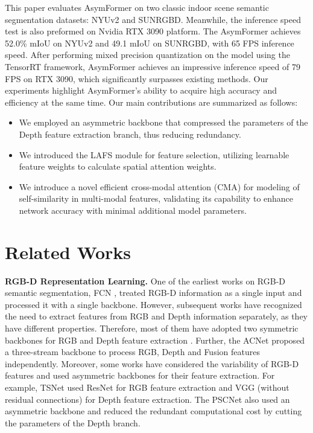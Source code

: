 \documentclass[letterpaper, 10 pt, conference]{ieeeconf}
\begin{document}
This paper evaluates AsymFormer on two classic indoor scene semantic segmentation datasets: NYUv2 and SUNRGBD. Meanwhile, the inference speed test is also preformed on Nvidia RTX 3090 platform. The AsymFormer achieves 52.0\% mIoU on NYUv2 and 49.1 mIoU on SUNRGBD, with 65 FPS inference speed. After performing mixed precision quantization on the model using the TensorRT framework, AsymFormer achieves an impressive inference speed of 79 FPS on RTX 3090, which significantly surpasses existing methods. Our experiments highlight AsymFormer's ability to acquire high accuracy and efficiency at the same time. Our main contributions are summarized as follows: \begin{itemize} \item[] We employed an asymmetric backbone that compressed the parameters of the Depth feature extraction branch, thus reducing redundancy.

\item[] We introduced the LAFS module for feature selection, utilizing learnable feature weights to calculate spatial attention weights.

\item[] We introduce a novel efficient cross-modal attention (CMA) for modeling of self-similarity in multi-modal features, validating its capability to enhance network accuracy with minimal additional model parameters.

\end{itemize}
 
\section{Related Works}
\textbf{RGB-D Representation Learning.} One of the earliest works on RGB-D semantic segmentation, FCN \cite{long2015fully}, treated RGB-D information as a single input and processed it with a single backbone. However, subsequent works have recognized the need to extract features from RGB and Depth information separately, as they have different properties. Therefore, most of them have adopted two symmetric backbones for RGB and Depth feature extraction \cite{hazirbas2017fusenet,jiang2018rednet,seichter2021efficient,seichter2022efficient,chen2020bi,liu2022cmx}. Further, the ACNet \cite{hu2019acnet} proposed a three-stream backbone to process RGB, Depth and Fusion features independently. Moreover, some works have considered the variability of RGB-D features and used asymmetric backbones for their feature extraction. For example, TSNet \cite{zhou2020tsnet} used ResNet \cite{he2016deep} for RGB feature extraction and VGG (without residual connections) \cite{simonyan2014very} for Depth feature extraction. The PSCNet \cite{du2022pscnet} also used an asymmetric backbone and reduced the redundant computational cost by cutting the parameters of the Depth branch.
\end{document}
